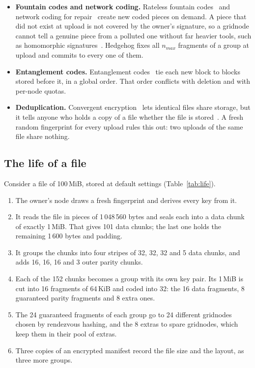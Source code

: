 \documentclass[10pt,a4paper,final]{article}
\begin{document}
\begin{itemize}
	\item \textbf{Fountain codes and network coding.} Rateless fountain codes~\cite{luby2002,mackay2005} and network
	      coding for repair~\cite{dimakis2010} create new coded pieces on demand. A piece that did not exist at upload
	      is not covered by the owner's signature, so a gridnode cannot tell a genuine piece from a polluted one
	      without far heavier tools, such as homomorphic signatures~\cite{boneh2009}. Hedgehog fixes all $n_{max}$
	      fragments of a group at upload and commits to every one of them.
	\item \textbf{Entanglement codes.} Entanglement codes~\cite{estrada2018} tie each new block to blocks stored
	      before it, in a global order. That order conflicts with deletion and with per-node quotas.
	\item \textbf{Deduplication.} Convergent encryption~\cite{douceur2002b} lets identical files share storage, but
	      it tells anyone who holds a copy of a file whether the file is stored~\cite{harnik2010}. A fresh random
	      fingerprint for every upload rules this out: two uploads of the same file share nothing.
\end{itemize}

\subsection{The life of a file}
\label{sec:life}

Consider a file of 100\,MiB, stored at default settings (Table~\ref{tab:life}).

\begin{enumerate}
	\item The owner's node draws a fresh fingerprint and derives every key from it.
	\item It reads the file in pieces of 1\,048\,560 bytes and seals each into a data chunk of exactly 1\,MiB. That
	      gives 101 data chunks; the last one holds the remaining 1\,600 bytes and padding.
	\item It groups the chunks into four stripes of 32, 32, 32 and 5 data chunks, and adds 16, 16, 16 and 3 outer
	      parity chunks.
	\item Each of the 152 chunks becomes a group with its own key pair. Its 1\,MiB is cut into 16 fragments of
	      64\,KiB and coded into 32: the 16 data fragments, 8 guaranteed parity fragments and 8 extra ones.
	\item The 24 guaranteed fragments of each group go to 24 different gridnodes chosen by rendezvous hashing, and
	      the 8 extras to spare gridnodes, which keep them in their pool of extras.
	\item Three copies of an encrypted manifest record the file size and the layout, as three more groups.
\end{enumerate}
\end{document}
